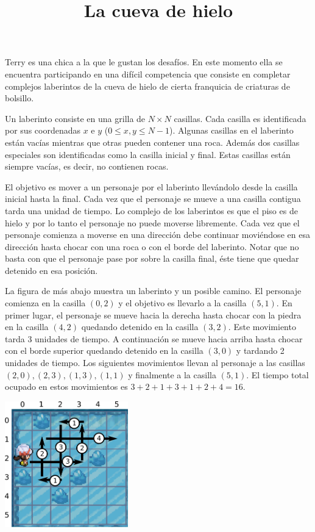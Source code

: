\documentclass{oci}
\title{La cueva de hielo}
\begin{document}
\maketitle
  Terry es una chica a la que le gustan los desafíos.
En este momento ella se encuentra participando en una difícil competencia que consiste en completar complejos laberintos de la cueva de hielo de cierta franquicia de criaturas de bolsillo.

Un laberinto consiste en una grilla de $N\times N$ casillas.
Cada casilla es identificada por sus coordenadas $x$ e $y$ ($0\leq x,y \leq N-1$).
Algunas casillas en el laberinto están vacías mientras que otras pueden contener una roca.
Además dos casillas especiales son identificadas como la casilla inicial y final.
Estas casillas están siempre vacías, es decir, no contienen rocas.


El objetivo es mover a un personaje por el laberinto llevándolo desde la casilla inicial hasta la final.
Cada vez que el personaje se mueve a una casilla contigua tarda una unidad de tiempo.
Lo complejo de los laberintos es que el piso es de hielo y por lo tanto el personaje no puede moverse libremente.
Cada vez que el personaje comienza a moverse en una dirección debe continuar moviéndose en esa dirección hasta chocar con una roca o con el borde del laberinto.
Notar que no basta con que el personaje pase por sobre la casilla final, éste tiene que quedar detenido en esa posición.

La figura de más abajo muestra un laberinto y un posible camino.
El personaje comienza en la casilla $(0, 2)$ y el objetivo es llevarlo a la casilla $(5,1)$.
En primer lugar, el personaje se mueve hacia la derecha hasta chocar con la piedra en la casilla $(4,2)$ quedando detenido en la casilla $(3,2)$.
Este movimiento tarda 3 unidades de tiempo.
A continuación se mueve hacia arriba hasta chocar con el borde superior quedando detenido en la casilla $(3,0)$ y tardando 2 unidades de tiempo.
Los siguientes movimientos llevan al personaje a las casillas $(2,0), (2,3), (1,3), (1,1)$ y finalmente a la casilla $(5,1)$.
El tiempo total ocupado en estos movimientos es $3+2+1+3+1+2+4=16$.

\begin{center}
	\includegraphics[width=0.4\textwidth]{Icepath2-arrows.png}
\end{center}
\end{document}
